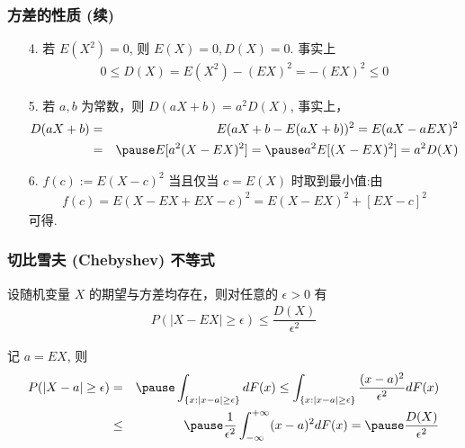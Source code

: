 	\begin{frame}
		\frametitle{方差的性质 (续)}
		\begin{enumerate}[<+-|alert@+>]
			\item[4.] 若 $E (X^2)=0$, 则 $E (X)=0, D (X)=0$. \pause 事实上
			\begin{eqnarray*}
				0\le D(X)=E(X^2)-(EX)^2=-(EX)^2\le 0
			\end{eqnarray*}

			\item[5.] 若 $a,b$ 为常数，则 $D (aX+b)=a^2D (X)$, \pause 事实上，
			\begin{eqnarray*}
				D(aX+b)&=&E(aX+b-E(aX+b))^2=E(aX-aEX)^2
				\\ &=&\pause E[a^2(X-EX)^2]=\pause a^2E[(X-EX)^2]=a^2D(X)    \end{eqnarray*}
			\item[6.] $f (c):=E (X-c)^2$ 当且仅当 $c=E (X)$ 时取到最小值:\pause 由
			\begin{eqnarray*}
				f(c)=E(X-EX+EX-c)^2=E(X-EX)^2+[EX-c]^2
			\end{eqnarray*}
			可得.
		\end{enumerate}
	\end{frame}


	\begin{frame}
		\frametitle{切比雪夫 (Chebyshev) 不等式}
		\begin{thm}
			设随机变量 $X$ 的期望与方差均存在，则对任意的 $\epsilon>0$ 有
			\begin{eqnarray*}
				P(|X-EX|\ge \epsilon)\le \dfrac{D(X)}{\epsilon^2}
			\end{eqnarray*}
		\end{thm}


		\pause \zheng 记 $a=EX$, 则
		\begin{eqnarray*}
			P(|X-a|\ge \epsilon)&=&\pause\int_{\{x:|x-a|\ge \epsilon\}}dF(x)\le \int_{\{x:|x-a|\ge \epsilon\}}\dfrac{(x-a)^2}{\epsilon^2}dF(x)\\
			&\le&\pause \dfrac{1}{\epsilon^2}\int_{-\infty}^{+\infty}(x-a)^2dF(x)=\pause \dfrac{D(X)}{\epsilon^2}
		\end{eqnarray*}

	\end{frame}


